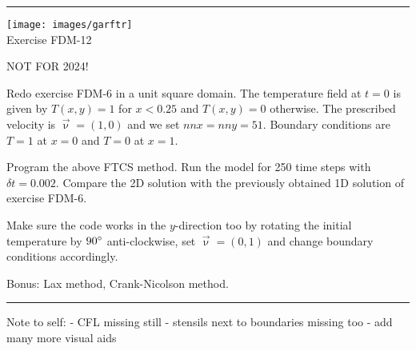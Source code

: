 \begin{center}
\begin{minipage}[t]{0.77\textwidth}
\par\noindent\rule{\textwidth}{0.4pt}

\begin{center}
\texttt{[image: images/garftr]} \\
{\color{orange}Exercise FDM-12}
\end{center}

NOT FOR 2024! 

Redo exercise FDM-6 in a unit square domain. 
The temperature field at $t=0$ is 
given by $T(x,y)=1$ for $x<0.25$ and $T(x,y)=0$ otherwise. The prescribed 
velocity is $\vec\upnu=(1,0)$ and we set $nnx=nny=51$.
Boundary conditions are $T=1$ at $x=0$ and $T=0$ at $x=1$.

Program the above FTCS method. Run the model for 250 time steps with $\delta t=0.002$. 
Compare the 2D solution with the previously obtained 1D solution of exercise FDM-6.

Make sure the code works in the $y$-direction too by rotating the initial temperature 
by $90\degree$ anti-clockwise, set $\vec{\upnu}=(0,1)$ and change boundary conditions accordingly. 

Bonus: Lax method, Crank-Nicolson method.

\par\noindent\rule{\textwidth}{0.4pt}
\end{minipage}
\end{center}

Note to self:
- CFL missing still
- stensils next to boundaries missing too
- add many more visual aids










